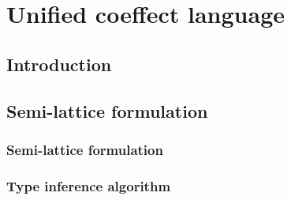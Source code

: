 
\chapter{Unified coeffect language} 
\label{ch:unified} 


\section{Introduction}


\section{Semi-lattice formulation}
\label{sec:unified-semilattice}

\subsection{Semi-lattice formulation}
\subsection{Type inference algorithm}


\newcommand{\tystmt}[2]{ (\text{\footnotesize{#1}})~~{#2} }
\newcommand{\ctxtrans}[3]{ #2 \rightsquigarrow #1, #3 }
\newcommand{\ctxtransnl}[3]{ \begin{array}{l} #2 \rightsquigarrow\\ #1, #3 \end{array}}

\newcommand{\SH}{ {\textcolor{sclr}{\mathcal{S}}} }
\newcommand{\sempty}{ {\textcolor{sclr}{ \hat{0}}} }
\newcommand{\sunit}{ {\textcolor{sclr}{\hat{1}}} }
\newcommand{\stimes}{ {\textcolor{sclr}{\diamond}} }
\newcommand{\sflat}{\star}

\newcommand{\amerge}{ \textcolor{aclr}{ \mathbin{\rotatebox[origin=c]{-90}{$\ltimes$}} } }
\newcommand{\asplit}{ \textcolor{aclr}{ \mathbin{\rotatebox[origin=c]{90}{$\ltimes$}} } }
\newcommand{\azero}{ \textcolor{aclr}{\bot} }
\newcommand{\aunit}{ \alift{\cunit} } %
\newcommand{\aweak}{ \alift{\czero} } %

